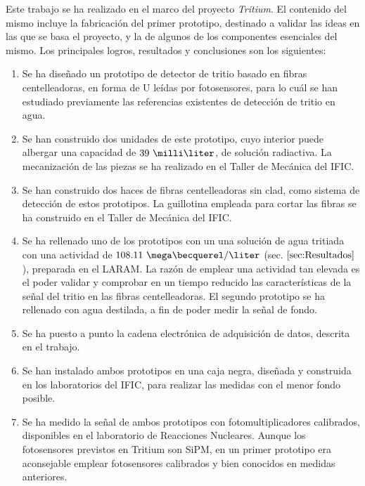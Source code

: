 


Este trabajo se ha realizado en el marco del proyecto \textit{Tritium}. El contenido del mismo incluye la fabricación del primer prototipo, destinado a validar las ideas en las que se basa el proyecto, y la de algunos de los componentes esenciales del mismo.  Los principales logros, resultados  y conclusiones son los siguientes:

\begin{enumerate}
\item Se ha diseñado un prototipo de detector de tritio basado en fibras centelleadoras, en forma de U leídas por fotosensores, para lo cuál se han estudiado previamente las referencias existentes de detección de tritio en agua.

\item Se han  construido dos unidades de este prototipo,  cuyo interior puede albergar una capacidad de $39~\milli\liter$,  de solución radiactiva. La mecanización de las piezas se ha realizado en el Taller de  Mecánica del IFIC.

\item Se han construido dos haces de fibras centelleadoras sin clad, como sistema de detección de estos prototipos.  La guillotina empleada para cortar las fibras se ha construido en el Taller de  Mecánica del IFIC.


\item Se ha rellenado uno de los prototipos con un una solución de agua tritiada con una actividad de $108.11~\mega\becquerel/\liter$ (sec. $\ref{sec:Resultados}$), preparada en el LARAM.  La  razón de emplear una actividad tan elevada es el poder validar y comprobar en un tiempo reducido las características de la señal  del tritio en las fibras centelleadoras. El segundo prototipo se ha rellenado con agua destilada, a fin de poder medir la señal de  fondo.

\item Se ha puesto a punto la cadena electrónica de adquisición de datos, descrita en el trabajo.

\item Se han instalado ambos prototipos en una caja negra, diseñada y construida en los laboratorios del IFIC, para realizar las medidas con el menor fondo posible.

\item Se ha medido la señal de ambos prototipos  con fotomultiplicadores calibrados, disponibles en el laboratorio de Reacciones Nucleares.  Aunque  los fotosensores  previstos en Tritium son SiPM, en un primer prototipo era  aconsejable emplear fotosensores calibrados y bien conocidos en medidas anteriores.


\end{enumerate}

